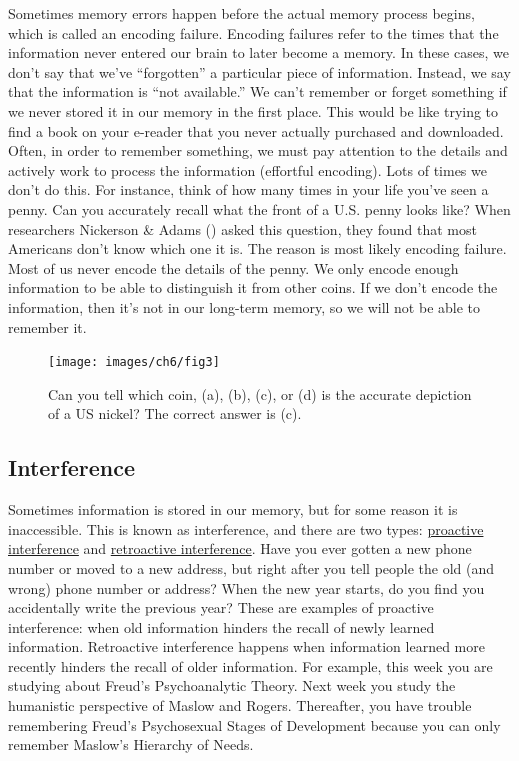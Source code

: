 \documentclass[
]{krantz}
\begin{document}
Sometimes memory errors happen before the actual memory process begins, which is called an encoding failure. Encoding failures refer to the times that the information never entered our brain to later become a memory. In these cases, we don't say that we've ``forgotten'' a particular piece of information. Instead, we say that the information is ``not available.'' We can't remember or forget something if we never stored it in our memory in the first place. This would be like trying to find a book on your e-reader that you never actually purchased and downloaded. Often, in order to remember something, we must pay attention to the details and actively work to process the information (effortful encoding). Lots of times we don't do this. For instance, think of how many times in your life you've seen a penny. Can you accurately recall what the front of a U.S. penny looks like? When researchers Nickerson \& Adams () asked this question, they found that most Americans don't know which one it is. The reason is most likely encoding failure. Most of us never encode the details of the penny. We only encode enough information to be able to distinguish it from other coins. If we don't encode the information, then it's not in our long-term memory, so we will not be able to remember it.

\begin{figure}

{\centering \texttt{[image: images/ch6/fig3]} 

}

\caption{Can you tell which coin, (a), (b), (c), or (d) is the accurate depiction of a US nickel? The correct answer is (c).}\label{fig:nickel}
\end{figure}

\subsection*{Interference}\label{interference}


Sometimes information is stored in our memory, but for some reason it is inaccessible. This is known as interference, and there are two types: \hyperref[proactive-interference]{proactive interference} and \hyperref[retroactive-interference]{retroactive interference}. Have you ever gotten a new phone number or moved to a new address, but right after you tell people the old (and wrong) phone number or address? When the new year starts, do you find you accidentally write the previous year? These are examples of proactive interference: when old information hinders the recall of newly learned information. Retroactive interference happens when information learned more recently hinders the recall of older information. For example, this week you are studying about Freud's Psychoanalytic Theory. Next week you study the humanistic perspective of Maslow and Rogers. Thereafter, you have trouble remembering Freud's Psychosexual Stages of Development because you can only remember Maslow's Hierarchy of Needs.
\end{document}
